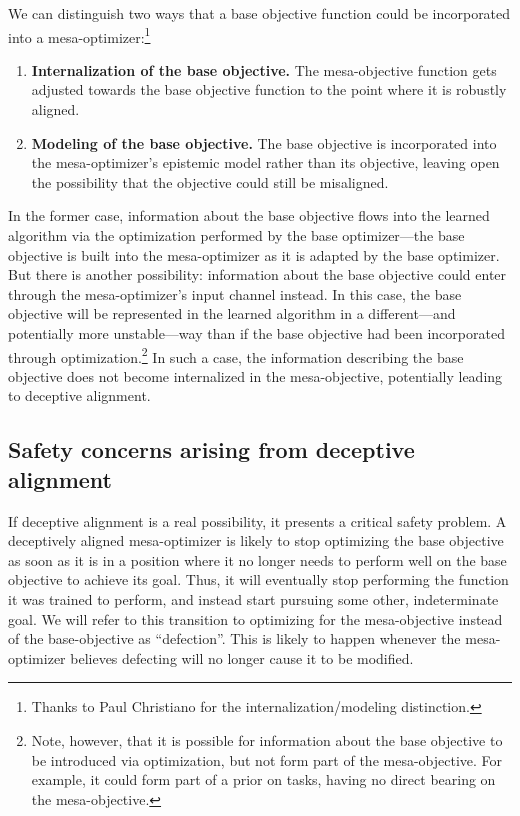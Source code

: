 \documentclass[
  onecolumn,
  natbib,
]{miri-tech-article}
\begin{document}
We can distinguish two ways that a base objective function could be incorporated into a mesa-optimizer:\footnote{Thanks to Paul Christiano for the internalization/modeling distinction.}
\begin{enumerate}
\item \textbf{Internalization of the base objective.} The mesa-objective function gets adjusted towards the base objective function to the point where it is robustly aligned.
\item \textbf{Modeling of the base objective.} The base objective is incorporated into the mesa-optimizer's epistemic model rather than its objective, leaving open the possibility that the objective could still be misaligned.
\end{enumerate}
In the former case, information about the base objective flows into the learned algorithm via the optimization performed by the base optimizer---the base objective is built into the mesa-optimizer as it is adapted by the base optimizer. But there is another possibility: information about the base objective could enter through the mesa-optimizer's input channel instead. In this case, the base objective will be represented in the learned algorithm in a different---and potentially more unstable---way than if the base objective had been incorporated through optimization.\footnote{Note, however, that it is possible for information about the base objective to be introduced via optimization, but not form part of the mesa-objective. For example, it could form part of a prior on tasks, having no direct bearing on the mesa-objective.} In such a case, the information describing the base objective does not become internalized in the mesa-objective, potentially leading to deceptive alignment.

\subsection{Safety concerns arising from deceptive alignment}
\label{sec:4.1}

If deceptive alignment is a real possibility, it presents a critical safety problem. A deceptively aligned mesa-optimizer is likely to stop optimizing the base objective as soon as it is in a position where it no longer needs to perform well on the base objective to achieve its goal. Thus, it will eventually stop performing the function it was trained to perform, and instead start pursuing some other, indeterminate goal. We will refer to this transition to optimizing for the mesa-objective instead of the base-objective as ``defection''. This is likely to happen whenever the mesa-optimizer believes defecting will no longer cause it to be modified.
\end{document}
